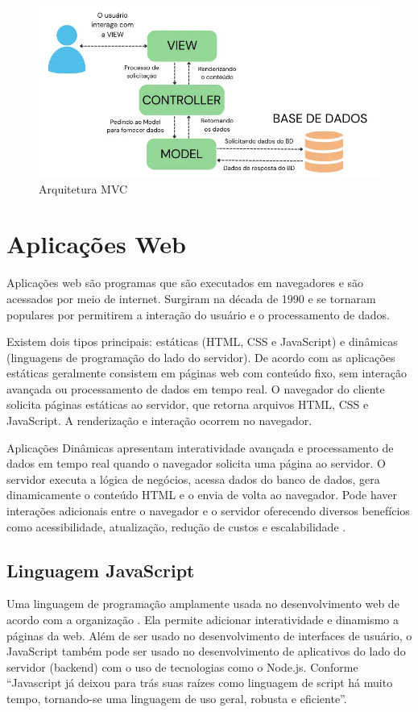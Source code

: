 \begin{figure}[htb]
    \caption{\label{fig:grafico-mvc}Arquitetura MVC}
    \begin{center}
        \includegraphics[scale=0.7]{imagens/arquitetura-mvc.png}
    \end{center}
\end{figure}


\section{Aplicações Web}
Aplicações web são programas que são executados em navegadores e são acessados por meio de internet.
Surgiram na década de 1990 e se tornaram populares por permitirem a interação do usuário e o processamento de dados.

Existem dois tipos principais: estáticas (HTML, CSS e JavaScript) e dinâmicas (linguagens de programação do lado do servidor).
De acordo com  as aplicações estáticas geralmente consistem em páginas web com conteúdo fixo, sem interação avançada ou processamento de dados em tempo real. O navegador do cliente solicita páginas estáticas ao servidor, que retorna arquivos HTML, CSS e JavaScript. A renderização e interação ocorrem no navegador.

Aplicações Dinâmicas apresentam interatividade avançada e processamento de dados em tempo real quando o navegador solicita uma página ao servidor. O servidor executa a lógica de negócios, acessa dados do banco de dados, gera dinamicamente o conteúdo HTML e o envia de volta ao navegador. Pode haver interações adicionais entre o navegador e o servidor 
oferecendo diversos benefícios como acessibilidade, atualização, redução de custos e escalabilidade \cite{aplicacoesWeb}.

\subsection{Linguagem JavaScript}
Uma linguagem de programação amplamente usada no desenvolvimento web de acordo com a organização . Ela permite adicionar interatividade e dinamismo a páginas da web. Além de ser usado no desenvolvimento de interfaces de usuário, o JavaScript também pode ser usado no desenvolvimento de aplicativos do lado do servidor (backend) com o uso de tecnologias como o Node.js. Conforme  ``Javascript já deixou para trás suas raízes como linguagem de script há muito tempo, tornando-se uma linguagem de uso geral, robusta e eficiente''.

